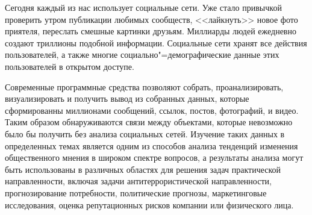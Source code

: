Сегодня каждый из нас использует социальные сети. Уже стало привычкой проверить утром публикации любимых сообществ, <<лайкнуть>> новое фото приятеля, переслать смешные картинки друзьям. Миллиарды людей ежедневно создают триллионы подобной информации. Социальные сети хранят все действия пользователей, а также многие социально"=демографические данные этих пользователей в открытом доступе. 

Современные программные средства позволяют собрать, проанализировать, визуализировать и получить вывод из собранных данных, которые сформированны миллионами сообщений, ссылок, постов, фотографий, и видео. Таким образом обнаруживаются связи между объектами, которые невозможно было бы получить без анализа социальных сетей. Изучение таких данных в определенных темах является одним из способов анализа тенденций изменения общественного
мнения в широком спектре вопросов, а результаты
анализа могут быть использованы в различных областях для решения задач практической направленности, включая задачи антитеррористической
направленности, прогнозирование потребности,
политические прогнозы, маркетинговые исследования, оценка репутационных рисков компании
или физического лица\cite{Tomsk_research}.

